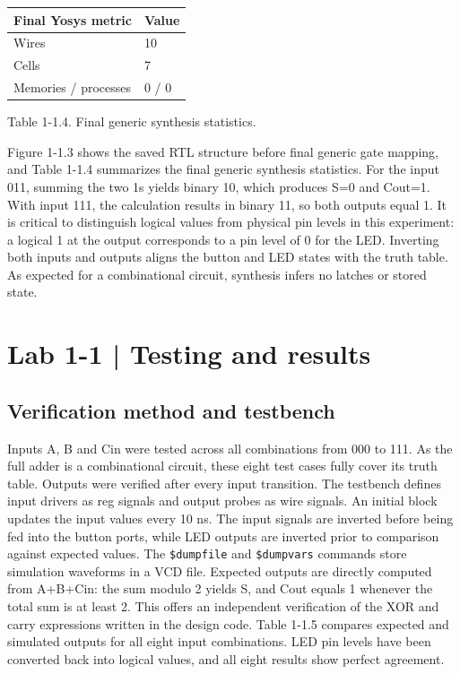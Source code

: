 \documentclass[10pt,a4paper]{article}
\begin{document}
\begingroup\small\setlength{\tabcolsep}{4pt}
\renewcommand{\arraystretch}{1.20}
\noindent\begin{tabular}{@{}p{}p{}@{}}
\toprule
\textbf{Final Yosys metric} & \textbf{Value} \\
\midrule
Wires & 10 \\
Cells & 7 \\
Memories / processes & 0 / 0 \\
\bottomrule
\end{tabular}\par\endgroup
\vspace{2mm}

{\small\raggedright Table 1-1.4. Final generic synthesis statistics.\par}

{\small\raggedright Figure 1-1.3 shows the saved RTL structure before final generic gate mapping, and Table 1-1.4 summarizes the final generic synthesis statistics. For the input 011, summing the two 1s yields binary 10, which produces S=0 and Cout=1. With input 111, the calculation results in binary 11, so both outputs equal 1. It is critical to distinguish logical values from physical pin levels in this experiment: a logical 1 at the output corresponds to a pin level of 0 for the LED. Inverting both inputs and outputs aligns the button and LED states with the truth table. As expected for a combinational circuit, synthesis infers no latches or stored state.\par}

\clearpage

\section*{Lab 1-1 | Testing and results}

\subsection*{Verification method and testbench}

Inputs A, B and Cin were tested across all combinations from 000 to 111. As the full adder is a combinational circuit, these eight test cases fully cover its truth table. Outputs were verified after every input transition. The testbench defines input drivers as reg signals and output probes as wire signals. An initial block updates the input values every 10 ns. The input signals are inverted before being fed into the button ports, while LED outputs are inverted prior to comparison against expected values. The \texttt{\$dumpfile} and \texttt{\$dumpvars} commands store simulation waveforms in a VCD file. Expected outputs are directly computed from A+B+Cin: the sum modulo 2 yields S, and Cout equals 1 whenever the total sum is at least 2. This offers an independent verification of the XOR and carry expressions written in the design code. Table 1-1.5 compares expected and simulated outputs for all eight input combinations. LED pin levels have been converted back into logical values, and all eight results show perfect agreement.\par
\end{document}
